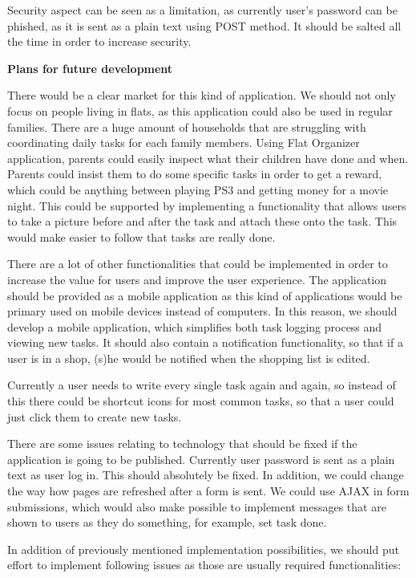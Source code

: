 \documentclass{sig-alt-release2}
\begin{document}
Security aspect can be seen as a limitation, as currently user’s password can be phished, as it is sent as a plain text using POST method. It should be salted all the time in order to increase security.

\textbf{Plans for future development}

There would be a clear market for this kind of application. We should not only focus on people living in flats, as this application could also be used in regular families. There are a huge amount of households that are struggling with coordinating daily tasks for each family members. Using Flat Organizer application, parents could easily inspect what their children have done and when. Parents could insist them to do some specific tasks in order to get a reward, which could be anything between playing PS3 and getting money for a movie night. This could be supported by implementing a functionality that allows users to take a picture before and after the task and attach these onto the task. This would make easier to follow that tasks are really done.

There are a lot of other functionalities that could be implemented in order to increase the value for users and improve the user experience. The application should be provided as a mobile application as this kind of applications would be primary used on mobile devices instead of computers. In this reason, we should develop a mobile application, which simplifies both task logging process and viewing new tasks. It should also contain a notification functionality, so that if a user is in a shop, (s)he would be notified when the shopping list is edited.

Currently a user needs to write every single task again and again, so instead of this there could be shortcut icons for most common tasks, so that a user could just click them to create new tasks. 

There are some issues relating to technology that should be fixed if the application is going to be published. Currently user password is sent as a plain text as user log in. This should absolutely be fixed. In addition, we could change the way how pages are refreshed after a form is sent. We could use AJAX in form submissions, which would also make possible to implement messages that are shown to users as they do something, for example, set task done.

In addition of previously mentioned implementation possibilities, we should put effort to implement following issues as those are usually required functionalities:
\end{document}
